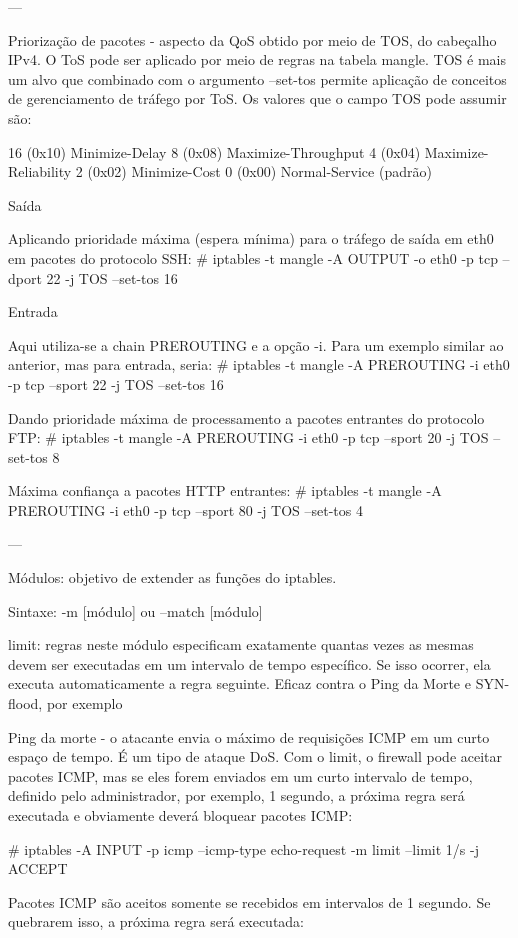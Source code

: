 ---

Priorização de pacotes - aspecto da QoS obtido por meio de TOS, do cabeçalho IPv4.
O ToS pode ser aplicado por meio de regras na tabela mangle. TOS é mais um alvo que combinado com o argumento --set-tos permite aplicação de conceitos de gerenciamento de tráfego por ToS. Os valores que o campo TOS pode assumir são:

16 (0x10) Minimize-Delay
8 (0x08) Maximize-Throughput
4 (0x04) Maximize-Reliability
2 (0x02) Minimize-Cost
0 (0x00) Normal-Service (padrão)

Saída

Aplicando prioridade máxima (espera mínima) para o tráfego de saída em eth0 em pacotes do protocolo SSH:
# iptables -t mangle -A OUTPUT -o eth0 -p tcp --dport 22 -j TOS --set-tos 16

Entrada

Aqui utiliza-se a chain PREROUTING e a opção -i. Para um exemplo similar ao anterior, mas para entrada, seria:
# iptables -t mangle -A PREROUTING -i eth0 -p tcp --sport 22 -j TOS --set-tos 16

Dando prioridade máxima de processamento a pacotes entrantes do protocolo FTP:
# iptables -t mangle -A PREROUTING -i eth0 -p tcp --sport 20 -j TOS --set-tos 8

Máxima confiança a pacotes HTTP entrantes:
# iptables -t mangle -A PREROUTING -i eth0 -p tcp --sport 80 -j TOS --set-tos 4

---

Módulos: objetivo de extender as funções do iptables.

Sintaxe: -m [módulo] ou --match [módulo]

limit: regras neste módulo especificam exatamente quantas vezes as mesmas devem ser executadas em um intervalo de tempo específico. Se isso ocorrer, ela executa automaticamente a regra seguinte. Eficaz contra o Ping da Morte e SYN-flood, por exemplo

Ping da morte - o atacante envia o máximo de requisições ICMP em um curto espaço de tempo. É um tipo de ataque DoS. Com o limit, o firewall pode aceitar pacotes ICMP, mas se eles forem enviados em um curto intervalo de tempo, definido pelo administrador, por exemplo, 1 segundo, a próxima regra será executada e obviamente deverá bloquear pacotes ICMP:

# iptables -A INPUT -p icmp --icmp-type echo-request -m limit --limit 1/s -j ACCEPT

Pacotes ICMP são aceitos somente se recebidos em intervalos de 1 segundo. Se quebrarem isso, a próxima regra será executada:

